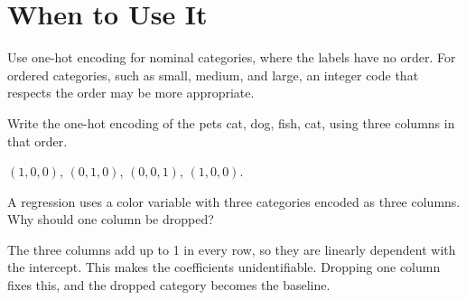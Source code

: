 \section{When to Use It}
Use one-hot encoding for nominal categories, where the labels have no order. For ordered categories, such as
small, medium, and large, an integer code that respects the order may be more appropriate.

\begin{Exercise}[label=oh1, title=Encode a variable]
Write the one-hot encoding of the pets cat, dog, fish, cat, using three columns in that order.
\end{Exercise}
\begin{Answer}[ref=oh1]
$(1,0,0)$, $(0,1,0)$, $(0,0,1)$, $(1,0,0)$.
\end{Answer}

\begin{Exercise}[label=oh2, title=Dropping a column]
A regression uses a color variable with three categories encoded as three columns. Why should one column be dropped?
\end{Exercise}
\begin{Answer}[ref=oh2]
The three columns add up to 1 in every row, so they are linearly dependent with the intercept. This makes the
coefficients unidentifiable. Dropping one column fixes this, and the dropped category becomes the baseline.
\end{Answer}
